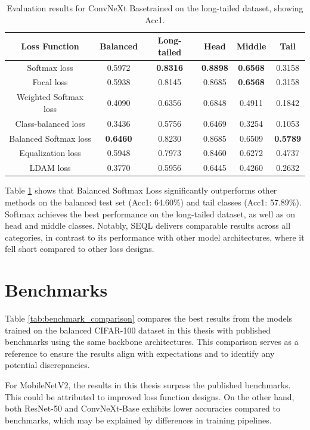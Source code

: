 \begin{table}[h!]
    \centering
    \caption{Evaluation results for ConvNeXt Basetrained on the long-tailed dataset, showing Acc1.}
    \small
    \begin{tabular}{cccccc}
        \toprule
        Loss Function & Balanced & Long-tailed & Head & Middle & Tail \\ 
        \midrule
        Softmax loss   & 0.5972 & \textbf{0.8316} & \textbf{0.8898} & \textbf{0.6568} & 0.3158 \\
        Focal loss   & 0.5938 & 0.8145 & 0.8685 & \textbf{0.6568} & 0.3158 \\
        Weighted Softmax loss   & 0.4090 & 0.6356 & 0.6848 & 0.4911 & 0.1842 \\
        Class-balanced loss   & 0.3436 & 0.5756 & 0.6469 & 0.3254 & 0.1053 \\
        Balanced Softmax loss   & \textbf{0.6460} & 0.8230 & 0.8685 & 0.6509 & \textbf{0.5789} \\
        Equalization loss   & 0.5948 & 0.7973 & 0.8460 & 0.6272 & 0.4737 \\
        LDAM loss   & 0.3770 & 0.5956 & 0.6445 & 0.4260 & 0.2632 \\
        \bottomrule
    \end{tabular}
    \label{tab:conv_lt_acc1_1}
\end{table}

Table \ref{tab:conv_lt_acc1_1} shows that Balanced Softmax Loss significantly outperforms other methods on the balanced test set (Acc1: 64.60\%) and tail classes (Acc1: 57.89\%). Softmax achieves the best performance on the long-tailed dataset, as well as on head and middle classes. Notably, SEQL delivers comparable results across all categories, in contrast to its performance with other model architectures, where it fell short compared to other loss designs.

\section{Benchmarks}
Table \ref{tab:benchmark_comparison} compares the best results from the models trained on the balanced CIFAR-100 dataset in this thesis with published benchmarks using the same backbone architectures. This comparison serves as a reference to ensure the results align with expectations and to identify any potential discrepancies. 

For MobileNetV2, the results in this thesis surpass the published benchmarks. This could be attributed to improved loss function designs. On the other hand, both ResNet-50 and ConvNeXt-Base exhibits lower accuracies compared to benchmarks, which may be explained by differences in training pipelines.


